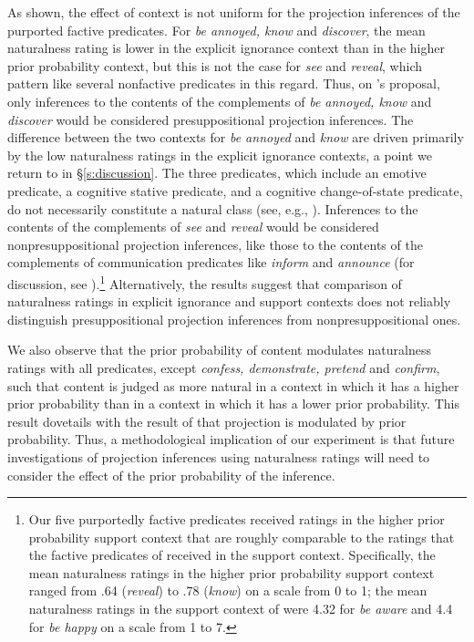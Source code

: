 \documentclass[11pt,fleqn]{article}
\newcommand{\6}{\mbox{$[\hspace*{-.6mm}[$}}
\newcommand{\9}{\mbox{$]\hspace*{-.6mm}]$}}
\newcommand{\citepos}[1]{\citeauthor{#1}'s \citeyear{#1}}
\begin{document}
As shown, the effect of context is not uniform for the projection inferences of the purported factive predicates. For {\em be annoyed, know} and {\em discover}, the mean naturalness rating is lower in the explicit ignorance context than in the higher prior probability context, but this is not the case for {\em see} and {\em reveal}, which pattern like several nonfactive predicates in this regard. Thus, on \citepos{mandelkern-etal2020} proposal, only inferences to the contents of the complements of \emph{be annoyed, know} and \emph{discover} would be considered presuppositional projection inferences. The difference between the two contexts for \emph{be annoyed} and \emph{know} are driven primarily by the low naturalness ratings in the explicit ignorance contexts, a point we return to in \S\ref{s:discussion}. The three predicates, which include an emotive predicate, a cognitive stative predicate, and a cognitive change-of-state predicate, do not necessarily constitute a natural class (see, e.g., \citealt{karttunen2016,djaerv-thesis}). Inferences to the contents of the complements of \emph{see} and \emph{reveal} would be considered nonpresuppositional projection inferences, like those to the contents of the complements of communication predicates like \emph{inform} and \emph{announce} (for discussion, see \citealt{anand-hacquard2014}).\footnote{Our five purportedly factive predicates received ratings in the higher prior probability support context that are roughly comparable to the ratings that the factive predicates of \citealt{mandelkern-etal2020} received in the support context. Specifically, the mean naturalness ratings in the higher prior probability support context ranged from .64 ({\em reveal}) to .78 ({\em know}) on a scale from 0 to 1; the mean naturalness ratings in the support context of \citealt{mandelkern-etal2020} were 4.32  for {\em be aware} and 4.4 for {\em be happy} on a scale from 1 to 7.} Alternatively, the results suggest that comparison of naturalness ratings in explicit ignorance and support contexts does not reliably distinguish presuppositional projection inferences from nonpresuppositional ones. 


We also observe that the prior probability of content modulates naturalness ratings with all predicates, except {\em confess, demonstrate, pretend} and {\em confirm}, such that content is judged as more natural in a context in which it has a higher prior probability than in a context in which it has a lower prior probability. This result dovetails with the result of \citealt{degen-tonhauser-openmind} that projection is modulated by prior probability. Thus, a methodological implication of our experiment is that future investigations of projection inferences using naturalness ratings will need to consider the effect of the prior probability of the inference.
\end{document}

